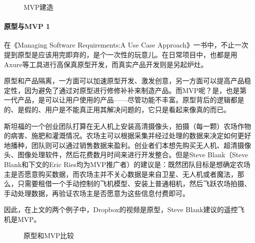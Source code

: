 \documentclass[letterpaper,10pt,english]{sphinxmanual}
\begin{document}
\begin{figure}[H]
\centering
\capstart

\noindent{}
\caption{MVP建造\sphinxfootnotemark[635]}\label{\detokenize{chapter_knowledge/MVP:id9}}\end{figure}
%
\begin{footnotetext}[635]\sphinxAtStartFootnote
{}
%
\end{footnotetext}\ignorespaces 

\paragraph{原型与MVP 1\sphinxfootnotemark[636]}
\label{\detokenize{chapter_knowledge/MVP:mvp-1}}%
\begin{footnotetext}[636]\sphinxAtStartFootnote
{}
%
\end{footnotetext}\ignorespaces 
在《Managing Software Requirements:A Use Case
Approach》一书中，不止一次提到原型是应该用完即弃的，是个一次性的玩意儿。在日常项目中，也都是用Axure等工具进行高保真原型开发，而真实产品开发则是另起炉灶。

原型和产品隔离，一方面可以加速原型开发、激发创意，另一方面可以提高产品稳定性，因为避免了通过对原型进行修修补补来制造产品。而MVP呢？是，也是第一代产品，是可以让用户使用的产品——尽管功能不丰富。原型背后的逻辑都是的、是假的、用户是不能真正用其解决问题的，它只是看起来像真的而已。

斯坦福的一个创业团队打算在无人机上安装高清摄像头，拍摄（每一颗）农场作物的病害、施肥和灌溉情况。农场主可以根据采集并经过处理的数据来决定如何更好地播种，团队则可以通过销售数据来盈利。创业者们本想先购买无人机、超清摄像头、图像处理软件，然后花费数月时间来进行开发整合。但是Steve
Blank（Steve Blank和下文的Eric
Ries均为MVP推广者）的建议是：既然团队目标是想确定农场主是否愿意购买数据，而农场主并不关心数据是来自卫星、无人机或者魔法，那么，只需要租借一个手动控制的飞机模型、安装上普通相机，然后飞跃农场拍摄、手动处理数据，再验证农场主是否愿意为这些信息付费即可。

因此，在上文的两个例子中，Dropbox的视频是原型，Steve
Blank建议的遥控飞机是MVP。

\begin{figure}[H]
\centering
\capstart

\noindent{}
\caption{原型和MVP比较}\label{\detokenize{chapter_knowledge/MVP:id10}}\end{figure}
\end{document}
